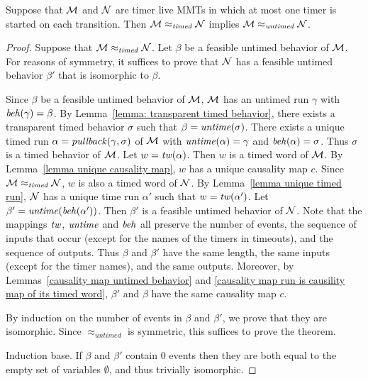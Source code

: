 \begin{theorem}
\label{timedimpliesuntimed}
Suppose that ${\mathcal M}$ and ${\mathcal N}$ are timer live MMTs in which at most one timer is started on each transition. Then
${\mathcal M} \approx_{\mathit{timed}} {\mathcal N}$
implies
${\mathcal M} \approx_{\mathit{untimed}} {\mathcal N}$.
\end{theorem}
\iflong
\begin{proof}
Suppose that ${\mathcal M} \approx_{\mathit{timed}} {\mathcal N}$.
Let $\beta$ be a feasible untimed behavior of ${\mathcal M}$.
For reasons of symmetry, it suffices to prove that ${\mathcal N}$ has a feasible untimed behavior $\beta'$ that is isomorphic to $\beta$.

Since $\beta$ be a feasible untimed behavior of ${\mathcal M}$, ${\mathcal M}$ has an untimed run $\gamma$ with $\mathit{beh}(\gamma) = \beta$.
By Lemma~\ref{lemma: transparent timed behavior}, there exists a 
transparent timed behavior $\sigma$ such that $\beta = \mathit{untime}(\sigma)$.
There exists a unique timed run $\alpha = \mathit{pullback}(\gamma,\sigma)$ of ${\mathcal M}$ with $\mathit{untime}(\alpha) = \gamma$ and $\mathit{beh}(\alpha) = \sigma$.
Thus $\sigma$ is a timed behavior of ${\mathcal M}$.
Let  $w = \mathit{tw}(\alpha)$.
Then $w$ is a timed word of ${\mathcal M}$.
By Lemma~\ref{lemma unique causality map}, $w$ has a unique causality map $c$.
Since ${\mathcal M} \approx_{\mathit{timed}} {\mathcal N}$, $w$ is also a timed word of ${\mathcal N}$.
By Lemma~\ref{lemma unique timed run}, ${\mathcal N}$ has a unique time run $\alpha'$ such that $w = \mathit{tw}(\alpha')$.
Let $\beta' = \mathit{untime}(\mathit{beh}(\alpha'))$.
Then $\beta'$ is a feasible untimed behavior of ${\mathcal N}$.
Note that the mappings $\mathit{tw}$, $\mathit{untime}$ and $\mathit{beh}$ all preserve the number of events, the sequence of inputs that occur (except for the names of the timers in timeouts), and the sequence of outputs. Thus $\beta$ and $\beta'$ have the same length, the same inputs (except for the timer names), and the same outputs.
Moreover, by Lemmas~\ref{causality map untimed behavior} and \ref{causality map run is causility map of its timed word},
$\beta'$ and $\beta$ have the same causality map $c$.

By induction on the number of events in $\beta$ and $\beta'$, we prove that they are isomorphic.
Since $\approx_{\mathit{untimed}}$ is symmetric, this suffices to prove the theorem.

Induction base. If $\beta$ and $\beta'$ contain $0$ events then they are both equal to the empty set of variables $\emptyset$,
and thus trivially isomorphic.


\end{proof}
